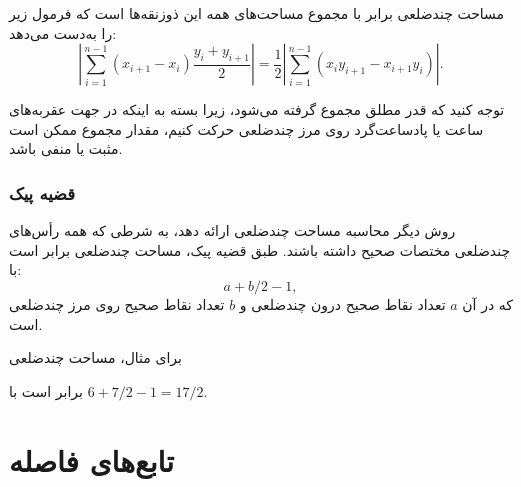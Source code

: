 مساحت چندضلعی برابر با مجموع مساحت‌های
همه این ذوزنقه‌ها است که فرمول زیر را به‌دست می‌دهد:
\[|\sum_{i=1}^{n-1} (x_{i+1}-x_{i}) \frac{y_i+y_{i+1}}{2}| =
\frac{1}{2} |\sum_{i=1}^{n-1} (x_i y_{i+1} - x_{i+1} y_i)|.\]

توجه کنید که قدر مطلق مجموع گرفته می‌شود،
زیرا بسته به اینکه در جهت عقربه‌های ساعت یا پادساعت‌گرد
روی مرز چندضلعی حرکت کنیم، مقدار مجموع ممکن است مثبت یا منفی باشد.

\subsubsection{قضیه پیک}


 روش دیگر محاسبه مساحت چندضلعی ارائه دهد، به شرطی که همه رأس‌های چندضلعی مختصات صحیح داشته باشند.
طبق قضیه پیک، مساحت چندضلعی برابر است با:
\[ a + b/2 -1,\]
که در آن $a$ تعداد نقاط صحیح درون چندضلعی و $b$ تعداد نقاط صحیح روی مرز چندضلعی است.

برای مثال، مساحت چندضلعی
\begin{center}
\end{center}
برابر است با $6+7/2-1=17/2$.

\section{تابع‌های فاصله}


